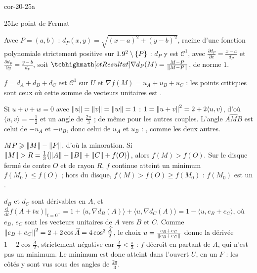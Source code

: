 
\begin{blocLivre}{cor-20-25a}
\begin{corrige}{25}{Le point de Fermat}
\begin{questions}
  \item Avec $P=(a,b)$ : $d_P(x,y)=\sqrt{(x-a)^{2}+(y-b)^{2}}$, racine
    d'une fonction polynomiale strictement positive sur
    $1.9^{2}\setminus\left\{P\right\}$ : $d_P$ y est $\mathcal{C}^{1}$, avec
    $\frac{\partial d_P}{\partial x}=\frac{x-a}{d_P}$ et
    $\frac{\partial d_P}{\partial y}=\frac{y-b}{d_P}$, soit
    $\res{\nabla d_P(M)=\frac{M-P}{\norme{M-P}}}$, de norme $1$.
  \item $f=d_A+d_B+d_C$ est $\mathcal{C}^{1}$ sur $U$ et
    $\nabla f(M)=u_A+u_B+u_C$ : les points critiques sont ceux où cette
    somme de vecteurs unitaires est .
  \item Si $u+v+w=0$ avec $\left\lVert u\right\rVert=\left\lVert v\right\rVert=\left\lVert w\right\rVert=1$ :
    $1=\left\lVert u+v\right\rVert^{2}=2+2\langle u,v\rangle$, d'où $\langle u,v\rangle=-\frac12$
    et un angle de $\frac{2\pi}{3}$ ; de même pour les autres couples.
    L'angle $\widehat{AMB}$ est celui de $-u_A$ et $-u_B$, donc celui de
    $u_A$ et $u_B$ : , comme les deux autres.
\end{questions}
\begin{questions}[resume]
  \item $MP\geqslant\left\lVert M\right\rVert-\left\lVert P\right\rVert$, d'où la minoration. Si
    $\left\lVert M\right\rVert>R=\frac13\bigl(\left\lVert A\right\rVert+\left\lVert B\right\rVert+\left\lVert C\right\rVert+f(O)\bigr)$, alors
    $f(M)>f(O)$. Sur le disque fermé de centre $O$ et de rayon $R$, $f$
    continue atteint un minimum $f(M_0)\leqslant f(O)$ ; hors du disque,
    $f(M)>f(O)\geqslant f(M_0)$ : $f(M_0)$ est un
    .
  \item $d_B$ et $d_C$ sont dérivables en $A$, et
    $\frac{\mathrm{d}}{\mathrm{d}t}f(A+tu)\big|_{t=0^{+}}
    =1+\langle u,\nabla d_B(A)\rangle+\langle u,\nabla d_C(A)\rangle
    =1-\langle u,e_B+e_C\rangle$, où $e_B$, $e_C$ sont les vecteurs
    unitaires de $A$ vers $B$ et $C$. Comme
    $\left\lVert e_B+e_C\right\rVert^{2}=2+2\cos\widehat A=4\cos^{2}\frac{\widehat A}{2}$, le
    choix $u=\frac{e_B+e_C}{\left\lVert e_B+e_C\right\rVert}$ donne la dérivée
    $1-2\cos\frac{\widehat A}{2}$, strictement négative car
    $\frac{\widehat A}{2}<\frac\pi3$ : $f$ décroît en partant de $A$, qui
    n'est pas un minimum. Le minimum est donc atteint dans l'ouvert $U$,
    en un  $F$ : les côtés y sont vus sous des
    angles de $\frac{2\pi}{3}$.
\end{questions}
\end{corrige}
\end{blocLivre}

